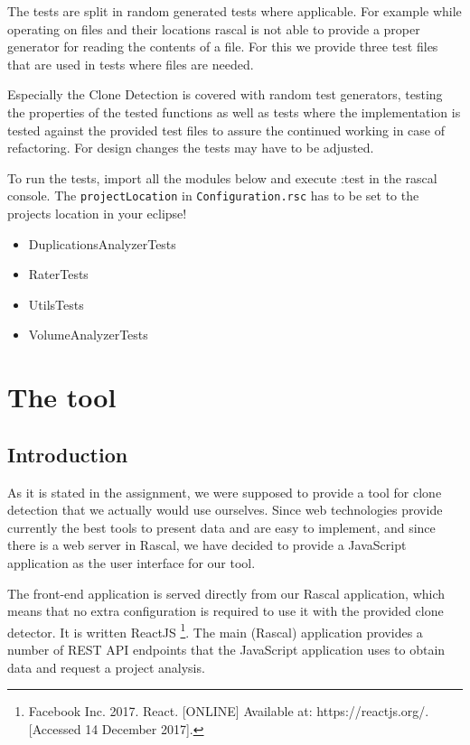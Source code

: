 \documentclass{uva-inf-article}
\begin{document}
The tests are split in random generated tests where applicable. For example while operating on files and their locations rascal is not able to provide a proper generator for reading the contents of a file. For this we provide three test files that are used in tests where files are needed. 

Especially the Clone Detection is covered with random test generators, testing the properties of the tested functions as well as tests where the implementation is tested against the provided test files to assure the continued working in case of refactoring. For design changes the tests may have to be adjusted.

To run the tests, import all the modules below and execute :test in the rascal console. The \texttt{projectLocation} in \texttt{Configuration.rsc} has to be set to the projects location in your eclipse!

\begin{itemize}

\item
  DuplicationsAnalyzerTests
\item
  RaterTests
\item
  UtilsTests
\item
  VolumeAnalyzerTests
\end{itemize}


\section{The tool}

\subsection{Introduction}
As it is stated in the assignment, we were supposed to provide a tool for clone detection that we actually would use ourselves.  Since web technologies provide currently the best tools to present data and are easy to implement, and since there is a web server in Rascal, we have decided to provide a JavaScript application as the user interface for our tool. 

The front-end application is served directly from our Rascal application, which means that no extra configuration is required to use it with the provided clone detector. It is written ReactJS \footnote{Facebook Inc. 2017. React. [ONLINE] Available at: https://reactjs.org/. [Accessed 14 December 2017].
}. The main (Rascal) application provides a number of REST API endpoints that the JavaScript application uses to obtain data and request a project analysis. 
\end{document}
